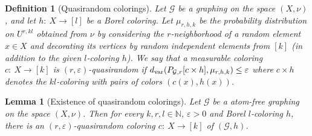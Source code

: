 \documentclass{article}
\newtheorem{lemma}[theorem]{Lemma}
\newtheorem{definition}[theorem]{Definition}
\def\GG{\mathcal{G}}\def\HH{\mathcal{H}}\def\II{\mathcal{I}}
\def\eps{\varepsilon}
\begin{document}
\begin{definition}[Quasirandom colorings]
Let $\GG$ be a graphing on the space $(X,\nu)$, and let $h:~X\to[l]$
be a Borel coloring. Let $\mu_{r,h,k}$ be the probability
distribution on $U^{r,kl}$ obtained from $\nu$ by considering the
$r$-neighborhood of a random element $x\in X$ and decorating its
vertices by random independent elements from $[k]$ (in addition to
the given $l$-coloring $h$). We say that a measurable coloring
$c:~X\rightarrow [k]$ is \emph{$(r,\eps)$-quasirandom} if $d_{\rm
var}(P_{\GG,r}[c\times h],\mu_{r,h,k})\leq\eps$ where  $c\times h$
denotes the $kl$-coloring with pairs of colors $(c(x),h(x))$.
\end{definition}

\begin{lemma}[Existence of quasirandom colorings]\label{quasirand}
Let $\GG$ be a atom-free graphing on the space $(X,\nu)$. Then for
every $k,r,l\in\mathbb{N}$, $\eps>0$ and Borel $l$-coloring $h$,
there is an $(r,\eps)$-quasirandom coloring $c:~X\rightarrow [k]$ of
$(\GG,h)$.
\end{lemma}
%
\end{document}
